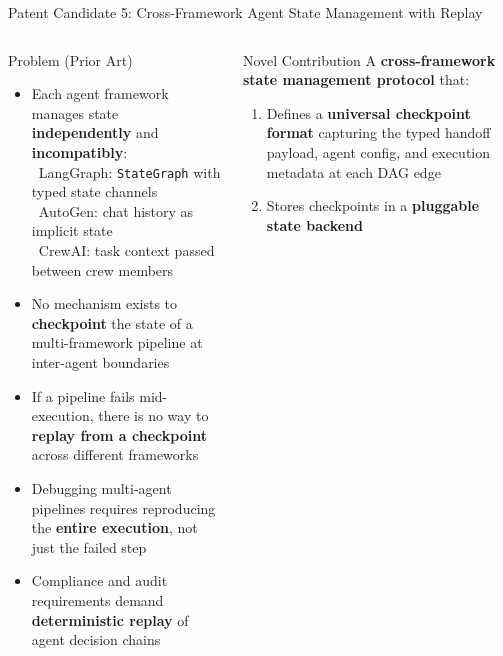 \begin{frame}{\fontsize{8}{10}\selectfont Patent Candidate 5: Cross-Framework Agent State Management with Replay}
  \vspace{-0.3cm}

  \fontsize{5.5}{6.5}\selectfont
  \begin{columns}[T]
    \begin{alertblock}{\fontsize{5}{6}\selectfont Problem (Prior Art)}
      \fontsize{5}{6}\selectfont
      \begin{itemize}
        \setlength{\itemsep}{0pt}
        \item Each agent framework manages state \textbf{independently} and \textbf{incompatibly}:\\
          {\fontsize{4.5}{5.5}\selectfont
          \textbullet\ LangGraph: \texttt{StateGraph} with typed state channels\\
          \textbullet\ AutoGen: chat history as implicit state\\
          \textbullet\ CrewAI: task context passed between crew members}
        \item No mechanism exists to \textbf{checkpoint} the state of a
              multi-framework pipeline at inter-agent boundaries
        \item If a pipeline fails mid-execution, there is no way to
              \textbf{replay from a checkpoint} across different frameworks
        \item Debugging multi-agent pipelines requires reproducing the
              \textbf{entire execution}, not just the failed step
        \item Compliance and audit requirements demand \textbf{deterministic
              replay} of agent decision chains
      \end{itemize}
    \end{alertblock}
    \vspace{-0.2cm}
    \begin{block}{\fontsize{5}{6}\selectfont Novel Contribution}
      \fontsize{5}{6}\selectfont
      A \textbf{cross-framework state management protocol} that:
      \begin{enumerate}
        \setlength{\itemsep}{0pt}
        \item Defines a \textbf{universal checkpoint format} capturing the typed
              handoff payload, agent config, and execution metadata at each
              DAG edge
        \item Stores checkpoints in a \textbf{pluggable state backend}

\end{enumerate}
\end{block}
\end{columns}
\end{frame}
